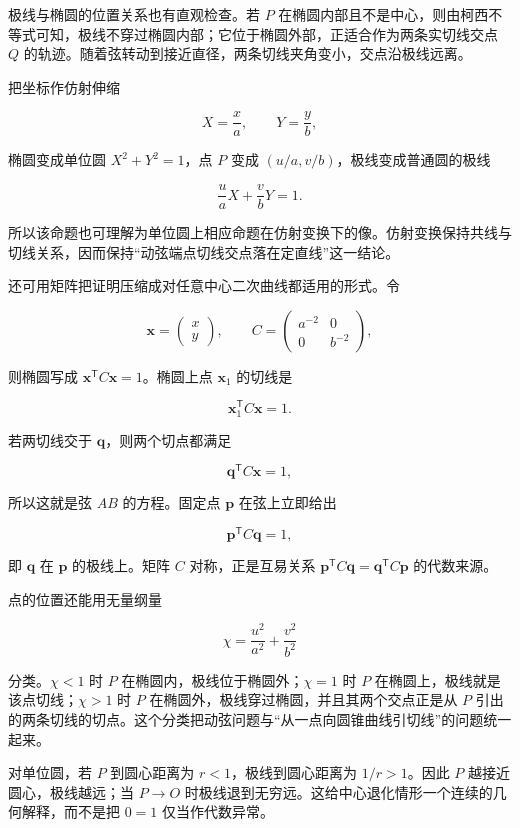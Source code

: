 \documentclass[12pt,a4paper,UTF8]{ctexart}
\begin{document}
极线与椭圆的位置关系也有直观检查。若 \(P\)
在椭圆内部且不是中心，则由柯西不等式可知，极线不穿过椭圆内部；它位于椭圆外部，正适合作为两条实切线交点
\(Q\) 的轨迹。随着弦转动到接近直径，两条切线夹角变小，交点沿极线远离。

把坐标作仿射伸缩

\[
X=\frac xa,\qquad Y=\frac yb,
\]

椭圆变成单位圆 \(X^2+Y^2=1\)，点 \(P\) 变成
\((u/a,v/b)\)，极线变成普通圆的极线

\[
\frac uaX+\frac vbY=1.
\]

所以该命题也可理解为单位圆上相应命题在仿射变换下的像。仿射变换保持共线与切线关系，因而保持``动弦端点切线交点落在定直线''这一结论。

还可用矩阵把证明压缩成对任意中心二次曲线都适用的形式。令

\[
\boldsymbol x=
\begin{pmatrix}x\\y\end{pmatrix},
\qquad
C=
\begin{pmatrix}a^{-2}&0\\0&b^{-2}\end{pmatrix},
\]

则椭圆写成 \(\boldsymbol x^{\mathsf T}C\boldsymbol x=1\)。椭圆上点
\(\boldsymbol x_1\) 的切线是

\[
\boldsymbol x_1^{\mathsf T}C\boldsymbol x=1.
\]

若两切线交于 \(\boldsymbol q\)，则两个切点都满足

\[
\boldsymbol q^{\mathsf T}C\boldsymbol x=1,
\]

所以这就是弦 \(AB\) 的方程。固定点 \(\boldsymbol p\) 在弦上立即给出

\[
\boldsymbol p^{\mathsf T}C\boldsymbol q=1,
\]

即 \(\boldsymbol q\) 在 \(\boldsymbol p\) 的极线上。矩阵 \(C\)
对称，正是互易关系
\(\boldsymbol p^{\mathsf T}C\boldsymbol q=\boldsymbol q^{\mathsf T}C\boldsymbol p\)
的代数来源。

点的位置还能用无量纲量

\[
\chi=\frac{u^2}{a^2}+\frac{v^2}{b^2}
\]

分类。\(\chi<1\) 时 \(P\) 在椭圆内，极线位于椭圆外；\(\chi=1\) 时 \(P\)
在椭圆上，极线就是该点切线；\(\chi>1\) 时 \(P\)
在椭圆外，极线穿过椭圆，并且其两个交点正是从 \(P\)
引出的两条切线的切点。这个分类把动弦问题与``从一点向圆锥曲线引切线''的问题统一起来。

对单位圆，若 \(P\) 到圆心距离为 \(r<1\)，极线到圆心距离为
\(1/r>1\)。因此 \(P\) 越接近圆心，极线越远；当 \(P\to O\)
时极线退到无穷远。这给中心退化情形一个连续的几何解释，而不是把 \(0=1\)
仅当作代数异常。
\end{document}
